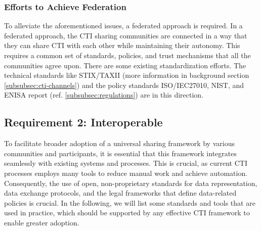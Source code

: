\subsubsection{Efforts to Achieve Federation}
To alleviate the aforementioned issues, a federated approach is required. In a federated approach, the CTI sharing communities are connected in a way that they can share CTI with each other while maintaining their autonomy. This requires a common set of standards, policies, and trust mechanisms that all the communities agree upon. There are some existing standardization efforts. The technical standards like STIX/TAXII (more information in background section \ref{subsubsec:cti-channels}) and the policy standards ISO/IEC27010, NIST, and ENISA report (ref. \ref{subsubsec:regulations}) are in this direction. 

\subsection{Requirement 2: Interoperable}
To facilitate broader adoption of a universal sharing framework by various communities and participants, it is essential that this framework integrates seamlessly with existing systems and processes. This is crucial, as current CTI processes employs many tools to reduce manual work and achieve automation. 
Consequently, the use of open, non-proprietary standards for data representation, data exchange protocols, and the legal frameworks that define data-related policies is crucial. In the following, we will list some standards and tools that are used in practice, which should be supported by any effective CTI framework to enable greater adoption.

